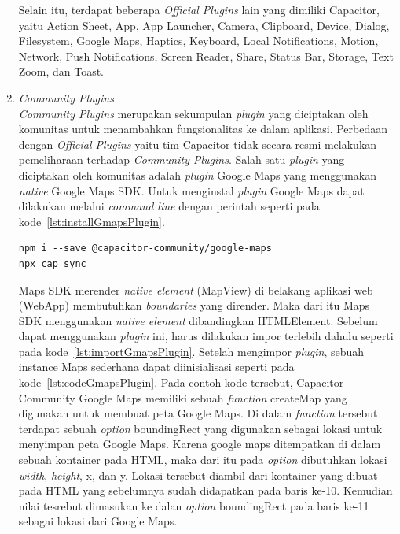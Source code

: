 \begin{enumerate}
\begin{enumerate}
		\end{enumerate}				
		
		Selain itu, terdapat beberapa \textit{Official Plugins} lain yang dimiliki Capacitor, yaitu Action Sheet, App, App Launcher, Camera, Clipboard, Device, Dialog, Filesystem, Google Maps, Haptics, Keyboard, Local Notifications, Motion, Network, Push Notifications, Screen Reader, Share, Status Bar, Storage, Text Zoom, dan Toast.


	\item \textit{Community Plugins} \\
		\textit{Community Plugins} merupakan sekumpulan \textit{plugin} yang diciptakan oleh komunitas untuk menambahkan fungsionalitas ke dalam aplikasi. Perbedaan dengan \textit{Official Plugins} yaitu tim Capacitor tidak secara resmi melakukan pemeliharaan terhadap \textit{Community Plugins}. Salah satu \textit{plugin} yang diciptakan oleh komunitas adalah \textit{plugin }Google Maps yang menggunakan \textit{native} Google Maps SDK. Untuk menginstal \textit{plugin} Google Maps dapat dilakukan melalui \textit{command line} dengan perintah seperti pada kode~\ref{lst:installGmapsPlugin}.	
		
\begin{lstlisting}[label={lst:installGmapsPlugin}, caption=Kode untuk Menginstal \textit{Plugin} Google Maps]
npm i --save @capacitor-community/google-maps
npx cap sync
\end{lstlisting}

	Maps SDK merender \textit{native element} (MapView) di belakang aplikasi web (WebApp) membutuhkan \textit{boundaries} yang dirender. Maka dari itu Maps SDK menggunakan \textit{native element} dibandingkan HTMLElement. Sebelum dapat menggunakan \textit{plugin} ini, harus dilakukan impor terlebih dahulu seperti pada kode~\ref{lst:importGmapsPlugin}. Setelah mengimpor \textit{plugin}, sebuah instance Maps sederhana dapat diinisialisasi seperti pada kode~\ref{lst:codeGmapsPlugin}. Pada contoh kode tersebut, Capacitor Community Google Maps memiliki sebuah \textit{function} createMap yang digunakan untuk membuat peta Google Maps. Di dalam \textit{function} tersebut terdapat sebuah \textit{option} boundingRect yang digunakan sebagai lokasi untuk menyimpan peta Google Maps. Karena google maps ditempatkan di dalam sebuah kontainer pada HTML, maka dari itu pada \textit{option} dibutuhkan lokasi \textit{width}, \textit{height}, x, dan y. Lokasi tersebut diambil dari kontainer yang dibuat pada HTML yang sebelumnya sudah didapatkan pada baris ke-10. Kemudian nilai tesrebut dimasukan ke dalan \textit{option} boundingRect pada baris ke-11 sebagai lokasi dari Google Maps.
	

\end{enumerate}

